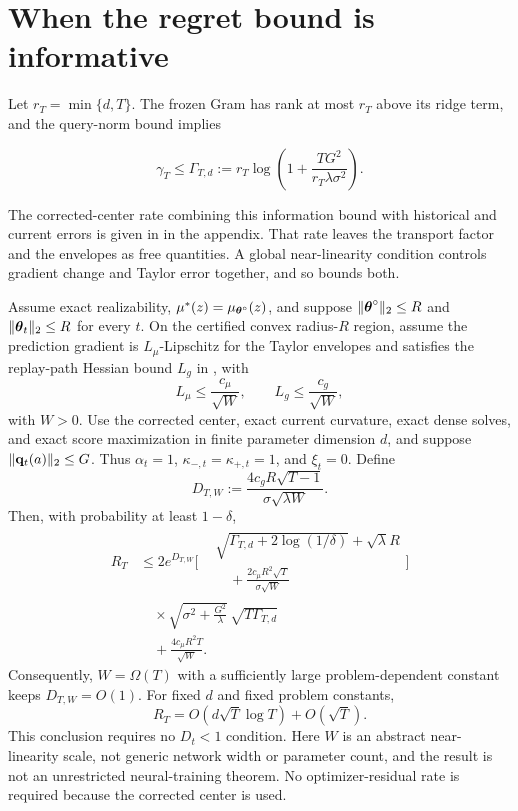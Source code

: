 \section{When the regret bound is informative}
\label{sec:closed-rates-new}

Let $r_T=\min\{d,T\}$. The frozen Gram has rank at most $r_T$ above its
ridge term, and the query-norm bound implies

\begin{equation}\label{eq:finite-d-gamma-new}
 \gamma_T\le\Gamma_{T,d}:=
 r_T\log\!\left(1+\frac{TG^2}{r_T\lambda\sigma^2}\right).
\end{equation}

The corrected-center rate combining this information bound with historical
and current errors is given in  in the appendix.
That rate leaves the transport factor and the envelopes as free quantities.
A global near-linearity condition controls gradient change and Taylor error
together, and so bounds both.

\begin{corollary}
\label{cor:global-near-linear-new}
Assume exact realizability, $\mu^*(z)=\mu_{\boldsymbol{\theta}^\circ}(z)$, and suppose
$\|\boldsymbol{\theta}^\circ\|_2\le R$ and $\|\boldsymbol{\theta}_t\|_2\le R$ for every $t$.
On the certified convex radius-$R$ region, assume the prediction gradient is
$L_\mu$-Lipschitz for the Taylor envelopes and satisfies the replay-path
Hessian bound $L_g$ in , with
\[
 L_\mu\le\frac{c_\mu}{\sqrt W},\qquad
 L_g\le\frac{c_g}{\sqrt W},
\]
with $W>0$.  Use the corrected center, exact current curvature, exact dense
solves, and exact score maximization in finite parameter dimension $d$, and
suppose $\|\mathbf{q}_t(a)\|_2\le G$.  Thus
$\alpha_t=1$, $\kappa_{-,t}=\kappa_{+,t}=1$, and $\xi_t=0$.
Define
\[
 D_{T,W}:=\frac{4c_gR\sqrt{T-1}}{\sigma\sqrt{\lambda W}}.
\]
Then, with probability at least $1-\delta$,
\begin{align}
 R_T
 &\le 2e^{D_{T,W}}
 \Biggl[
 \begin{aligned}
  &\sqrt{\Gamma_{T,d}+2\log(1/\delta)}+\sqrt\lambda R\\[-1mm]
  &\quad+\frac{2c_\mu R^2\sqrt T}{\sigma\sqrt W}
 \end{aligned}
 \Biggr]\nonumber\\[-1mm]
 &\quad\times
 \sqrt{\sigma^2+\frac{G^2}{\lambda}}\,
 \sqrt{T\Gamma_{T,d}}\nonumber\\
 &\quad+\frac{4c_\mu R^2T}{\sqrt W}.
 \label{eq:global-near-linear-new}
\end{align}
Consequently, $W=\Omega(T)$ with a sufficiently large problem-dependent
constant keeps $D_{T,W}=O(1)$.  For fixed $d$ and fixed problem constants,
\[
 R_T=O(d\sqrt T\log T)+O(\sqrt T).
\]
This conclusion requires no $D_t<1$ condition.  Here $W$ is an abstract
near-linearity scale, not generic network width or parameter count, and the
result is not an unrestricted neural-training theorem.  No optimizer-residual
rate is required because the corrected center is used.
\end{corollary}



